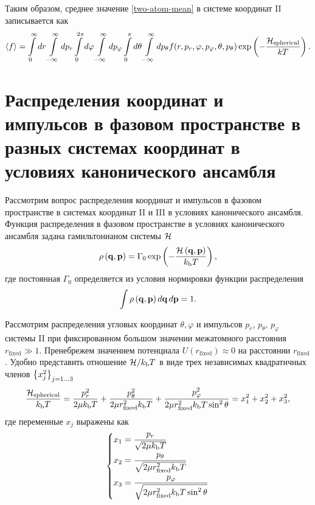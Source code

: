 Таким образом, среднее значение \eqref{two-atom-mean} в системе координат II записывается как
\begin{gather}
    \langle f \rangle = \int\limits_0^\infty dr \int\limits_{-\infty}^\infty dp_r \int\limits_0^{2\pi} d\varphi \int\limits_{-\infty}^\infty dp_\varphi \int\limits_0^\pi d\theta \int\limits_{-\infty}^\infty dp_\theta f(r, p_r, \varphi, p_\varphi, \theta, p_\theta) \exp \left( -\frac{\mathcal{H}_\text{spherical}}{k T} \right). \label{two-atom-mean-spherical}
\end{gather}

\section{Распределения координат и импульсов в фазовом пространстве в разных системах координат в условиях канонического ансамбля}

Рассмотрим вопрос распределения координат и импульсов в фазовом пространстве в системах координат II и III в условиях канонического ансамбля. Функция распределения в фазовом пространстве в условиях канонического ансамбля задана гамильтонианом системы $\mathcal{H}$ \cite{hill} 
\begin{gather}
    \rho \left( \mathbf{q}, \mathbf{p} \right) = \Gamma_0 \exp \left( -\frac{\mathcal{H} \left( \mathbf{q}, \mathbf{p} \right)}{k_\text{b} T} \right),
\end{gather}
% 
где постоянная $\Gamma_0$ определяется из условия нормировки функции распределения
\begin{gather}
    \int \rho \left( \mathbf{q}, \mathbf{p} \right) d \mathbf{q} \, d\mathbf{p} = 1.
\end{gather}

Рассмотрим распределения угловых координат $\theta, \varphi$ и импульсов $p_r$, $p_\theta$, $p_\varphi$ системы II при фиксированном большом значении межатомного расстояния $r_\text{fixed} \gg 1$. Пренебрежем значением потенциала $U(r_\text{fixed}) \approx 0$ на расстоянии $r_\text{fixed}$. Удобно представить отношение $\mathcal{H} / k_\text{b} T$ в виде трех независимых квадратичных членов $\left\{ x_j^2 \right\}_{j = 1 \dots 3}$
\begin{gather}
    \frac{\mathcal{H}_\text{spherical}}{k_\text{b} T} = \frac{p_r^2}{2 \mu k_\text{b} T} + \frac{p_\theta^2}{2 \mu r_\text{fixed}^2 k_\text{b} T} + \frac{p_\varphi^2}{2 \mu r_\text{fixed}^2 k_\text{b} T \sin^2 \theta} = x_1^2 + x_2^2 + x_3^2, \label{two-atom-spherical-hamiltonian-xs} 
\end{gather}
%
где переменные $x_j$ выражены как
\begin{gather}
    \left\{
    \begin{aligned}
        x_1 &= \frac{p_r}{\sqrt{2 \mu k_\text{b} T}} \\
        x_2 &= \frac{p_\theta}{\sqrt{2 \mu r_\text{fixed}^2 k_\text{b} T}} \\
        x_3 &= \frac{p_\varphi}{\sqrt{2 \mu r_\text{fixed}^2 k_\text{b} T \sin^2 \theta}}
    \end{aligned}
\right. \label{two-atom-xs}
\end{gather}

